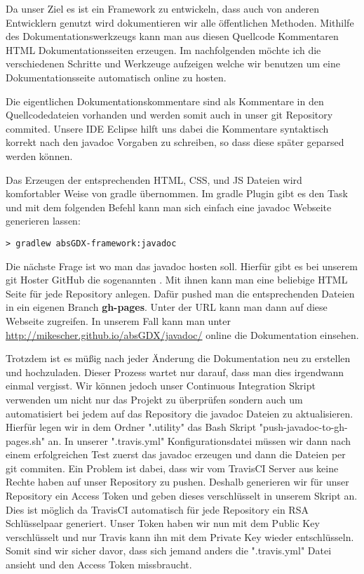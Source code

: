 
Da unser Ziel es ist ein Framework zu entwickeln, dass auch von anderen Entwicklern genutzt wird dokumentieren wir alle öffentlichen Methoden. Mithilfe des Dokumentationswerkzeugs  kann man aus diesen Quellcode Kommentaren HTML Dokumentationsseiten erzeugen. Im nachfolgenden möchte ich die verschiedenen Schritte und Werkzeuge aufzeigen welche wir benutzen um eine Dokumentationsseite automatisch online zu hosten.

Die eigentlichen Dokumentationskommentare sind als Kommentare in den Quellcodedateien vorhanden und werden somit auch in unser git Repository commited. Unsere IDE Eclipse hilft uns dabei die Kommentare syntaktisch korrekt nach den javadoc Vorgaben zu schreiben, so dass diese später geparsed werden können.

Das Erzeugen der entsprechenden HTML, CSS, und JS Dateien wird komfortabler Weise von gradle übernommen. Im gradle Plugin  gibt es den Task  und mit dem folgenden Befehl kann man sich einfach eine javadoc Webseite generieren lassen: 

\begin{lstlisting}[caption=Gradle in der Kommandozeile, title=\hspace{0 pt}, style=cmd]
> gradlew absGDX-framework:javadoc
\end{lstlisting}

Die nächste Frage ist wo man das javadoc hosten soll. Hierfür gibt es bei unserem git Hoster GitHub die sogenannten . Mit ihnen kann man eine beliebige HTML Seite für jede Repository anlegen. Dafür pushed man die entsprechenden Dateien in ein eigenen Branch \textbf{gh-pages}. Unter der URL  kann man dann auf diese Webseite zugreifen. In unserem Fall kann man unter \href{http://mikescher.github.io/absGDX/javadoc/}{http://mikescher.github.io/absGDX/javadoc/} online die Dokumentation einsehen.

Trotzdem ist es müßig nach jeder Änderung die Dokumentation neu zu erstellen und hochzuladen. Dieser Prozess wartet nur darauf, dass man dies irgendwann einmal vergisst.
Wir können jedoch unser Continuous Integration Skript verwenden um nicht nur das Projekt zu überprüfen sondern auch um automatisiert bei jedem  auf das Repository die javadoc Dateien zu aktualisieren.
Hierfür legen wir in dem Ordner ".utility" das Bash Skript "push-javadoc-to-gh-pages.sh" an. In unserer ".travis.yml" Konfigurationsdatei müssen wir dann nach einem erfolgreichen Test zuerst das javadoc erzeugen und dann die Dateien per git commiten. Ein Problem ist dabei, dass wir vom TravisCI Server aus keine Rechte haben auf unser Repository zu pushen. Deshalb generieren wir für unser Repository ein Access Token und geben dieses verschlüsselt in unserem Skript an. Dies ist möglich da TravisCI automatisch für jede Repository ein RSA Schlüsselpaar generiert. Unser Token haben wir nun mit dem Public Key verschlüsselt und nur Travis kann ihn mit dem Private Key wieder entschlüsseln. Somit sind wir sicher davor, dass sich jemand anders die  ".travis.yml" Datei ansieht und den Access Token missbraucht.

